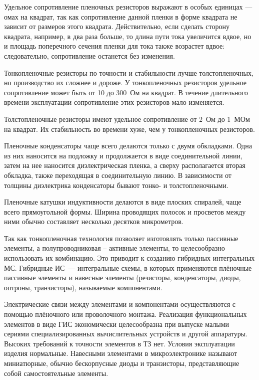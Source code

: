 Удельное сопротивление пленочных резисторов выражают в особых единицах --- омах на квадрат, так как сопротивление данной пленки в форме квадрата не зависит от размеров этого квадрата. Действительно, если сделать сторону квадрата, например, в два раза больше, то длина пути тока увеличится вдвое, но и площадь поперечного сечения пленки для тока также возрастет вдвое: следовательно, сопротивление останется без изменения. 

Тонкопленочные резисторы по точности и стабильности лучше толстопленочных, но производство их сложнее и дороже. У тонкопленочных резисторов удельное сопротивление может быть от 10 до 300~Ом на квадрат. В течение длительного времени эксплуатации сопротивление этих резисторов мало изменяется.

Толстопленочные резисторы имеют удельное сопротивление от 2~Ом до 1~МОм на квадрат. Их стабильность во времени хуже, чем у тонкопленочных резисторов.

Пленочные конденсаторы чаще всего делаются только с двумя обкладками. Одна из них наносится на подложку и продолжается в виде соединительной линии, затем на нее наносится диэлектрическая пленка, а сверху располагается вторая обкладка, также переходящая в соединительную линию. В зависимости от толщины диэлектрика конденсаторы бывают тонко- и толстопленочными.

Пленочные катушки индуктивности делаются в виде плоских спиралей, чаще всего прямоугольной формы. Ширина проводящих полосок и просветов между ними обычно составляет несколько десятков микрометров. 

Так как тонкопленочная технология позволяет изготовлять только пассивные элементы, а полупроводниковая -- активные элементы, то целесообразно использовать их комбинацию. Это приводит к созданию гибридных интегральных МС. Гибридные ИС~--- интегральные схемы, в которых применяются плёночные пассивные элементы и навесные элементы (резисторы, конденсаторы, диоды, оптроны, транзисторы), называемые компонентами.

Электрические связи между элементами и компонентами осуществляются с помощью плёночного или проволочного монтажа. Реализация функциональных элементов в виде ГИС экономически целесообразна при выпуске малыми сериями специализированных вычислительных устройств и другой аппаратуры. Высоких требований к точности элементов в ТЗ нет. Условия эксплуатации изделия нормальные. Навесными элементами в микроэлектронике называют миниатюрные, обычно бескорпусные диоды и транзисторы, представляющие собой самостоятельные элементы. 

